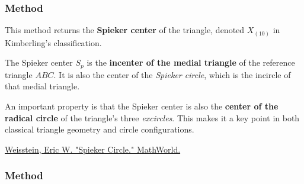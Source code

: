 
\subsubsection{Method } %
\label{ssub:method_triangle_spieker_center}

This method returns the \textbf{Spieker center} of the triangle, denoted $X_{(10)}$ in Kimberling’s classification.

\medskip
\noindent
The Spieker center $S_p$ is the \textbf{incenter of the medial triangle} of the reference triangle $ABC$. It is also the center of the \emph{Spieker circle}, which is the incircle of that medial triangle.

\medskip
\noindent
An important property is that the Spieker center is also the \textbf{center of the radical circle} of the triangle’s three \emph{excircles}. This makes it a key point in both classical triangle geometry and circle configurations.

\begin{flushright}
\small
\href{https://mathworld.wolfram.com/SpiekerCircle.html}{Weisstein, Eric W. "Spieker Circle." MathWorld.}
\end{flushright}

\vspace{1em}

\begin{tkzexample}[latex=.5\textwidth]
\end{tkzexample}



\subsubsection{Method } %
\label{ssub:method_triangle_euler__points}


